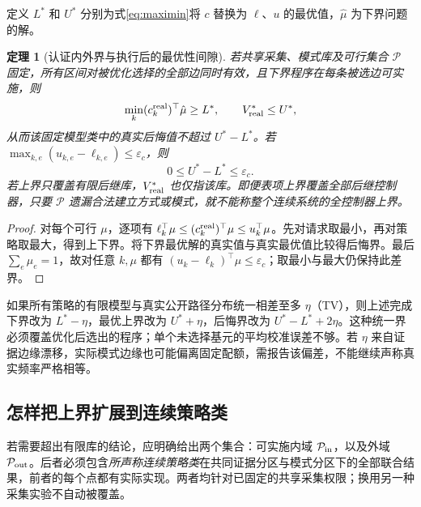 \documentclass[UTF8,11pt,a4paper,fontset=fandol]{ctexart}
\numberwithin{equation}{section}
\newtheorem{theorem}{定理}[section]
\theoremstyle{definition}
\begin{document}
定义 $L^*$ 和 $U^*$ 分别为式\eqref{eq:maximin}将 $c$ 替换为 $\ell$、$u$ 的最优值，$\hat\mu$ 为下界问题的解。

\begin{theorem}[认证内外界与执行后的最优性间隙]
\label{thm:bounds}
若共享采集、模式库及可行集合 $\mathcal P$ 固定，所有区间对被优化选择的全部边同时有效，且下界程序在每条被选边可实施，则
\begin{equation}
\min_k(c_k^{\rm real})^\top\hat\mu\ge L^*,
\qquad
V^*_{\rm real}\le U^*,
\end{equation}
从而该固定模型类中的真实后悔值不超过 $U^*-L^*$。若
$\max_{k,e}(u_{k,e}-\ell_{k,e})\le\varepsilon_c$，则
\begin{equation}
0\le U^*-L^*\le\varepsilon_c.
\label{eq:regret}
\end{equation}
若上界只覆盖有限后继库，$V^*_{\rm real}$ 也仅指该库。即便表项上界覆盖全部后继控制器，只要 $\mathcal P$ 遗漏合法建立方式或模式，就不能称整个连续系统的全控制器上界。
\end{theorem}
\begin{proof}
对每个可行 $\mu$，逐项有 $\ell_k^\top\mu\le(c_k^{\rm real})^\top\mu\le u_k^\top\mu$。先对请求取最小，再对策略取最大，得到上下界。将下界最优解的真实值与真实最优值比较得后悔界。最后 $\sum_e\mu_e=1$，故对任意 $k,\mu$ 都有 $(u_k-\ell_k)^\top\mu\le\varepsilon_c$；取最小与最大仍保持此差界。\end{proof}

如果所有策略的有限模型与真实公开路径分布统一相差至多 $\eta$（TV），则上述完成下界改为 $L^*-\eta$，最优上界改为 $U^*+\eta$，后悔界改为 $U^*-L^*+2\eta$。这种统一界必须覆盖优化后选出的程序；单个未选择基元的平均校准误差不够。若 $\eta$ 来自证据边缘漂移，实际模式边缘也可能偏离固定配额，需报告该偏差，不能继续声称真实频率严格相等。

\subsection{怎样把上界扩展到连续策略类}
若需要超出有限库的结论，应明确给出两个集合：可实施内域 $\mathcal P_{\rm in}$，以及外域 $\mathcal P_{\rm out}$。后者必须包含\emph{所声称连续策略类}在共同证据分区与模式分区下的全部联合结果，前者的每个点都有实际实现。两者均针对已固定的共享采集权限；换用另一种采集实验不自动被覆盖。
\end{document}
